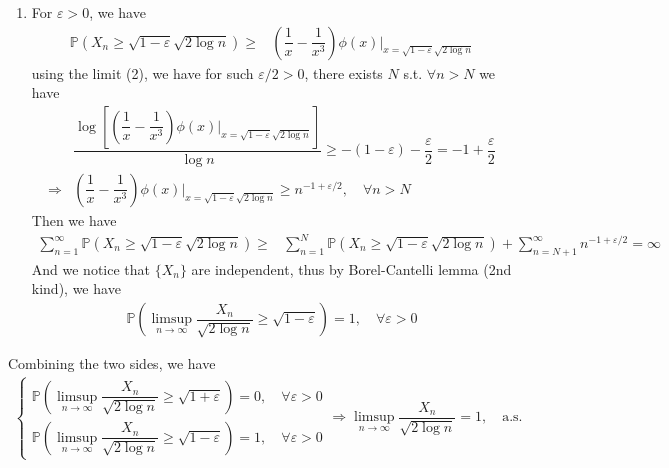 \documentclass[11pt,a4paper]{article}
\numberwithin{equation}{section}%
\begin{document}
\begin{enumerate}[topsep=2pt,itemsep=2pt]
    
    \item For $ \varepsilon >0 $, we have
    \begin{align*}
        \mathbb{P}\left( X_n\geq \sqrt{1-\varepsilon }\sqrt{2\log n} \right) \geq &  \left(\dfrac{ 1 }{ x } - \dfrac{ 1 }{ x^3 }\right) \phi(x) \Big|_{x=\sqrt{1-\varepsilon }\sqrt{2\log n}} 
    \end{align*}
    using the limit (2), we have for such $ \varepsilon /2 >0 $, there exists $ N $ s.t. $ \forall n>N $ we have
    \begin{align*}
        &\dfrac{ \log \left[ \left(\dfrac{ 1 }{ x } - \dfrac{ 1 }{ x^3 }\right) \phi(x) \Big|_{x=\sqrt{1-\varepsilon }\sqrt{2\log n}} \right] }{ \log n } \geq -(1-\varepsilon )-\dfrac{ \varepsilon  }{ 2 } = -1+\dfrac{ \varepsilon  }{ 2 } \\
        \Rightarrow& \left(\dfrac{ 1 }{ x } - \dfrac{ 1 }{ x^3 }\right) \phi(x) \Big|_{x=\sqrt{1-\varepsilon }\sqrt{2\log n}} \geq n^{-1+\varepsilon /2} ,\quad \forall n>N 
    \end{align*}
    Then we have
    \begin{align*}
        \sum_{n=1}^\infty  \mathbb{P}\left( X_n\geq \sqrt{1-\varepsilon }\sqrt{2\log n} \right) \geq & \sum_{n=1}^N  \mathbb{P}\left( X_n\geq \sqrt{1-\varepsilon }\sqrt{2\log n} \right) + \sum_{n=N+1}^\infty n^{-1+\varepsilon /2} = \infty 
    \end{align*}
    And we notice that $ \{X_n\} $ are independent, thus by Borel-Cantelli lemma (2nd kind), we have
    \begin{align*}
        \mathbb{P}\left( \limsup _{n\to\infty }\dfrac{ X_n }{ \sqrt{2\log n}  }\geq \sqrt{1-\varepsilon }   \right) = 1 ,\quad \forall \varepsilon >0 
    \end{align*}
    
\end{enumerate}


Combining the two sides, we have
\begin{align*}
    \begin{cases}
        \mathbb{P}\left( \limsup _{n\to\infty }\dfrac{ X_n }{ \sqrt{2\log n}  }\geq \sqrt{1+\varepsilon }   \right) = 0 ,\quad \forall \varepsilon >0\\
        \mathbb{P}\left( \limsup _{n\to\infty }\dfrac{ X_n }{ \sqrt{2\log n}  }\geq \sqrt{1-\varepsilon }   \right) = 1 ,\quad \forall \varepsilon >0
    \end{cases}  \Rightarrow \limsup _{n\to\infty }\dfrac{ X_n }{ \sqrt{2\log n}  }=1,\quad \text{a.s.}
\end{align*}
\end{document}
